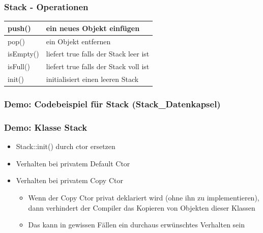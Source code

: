 \begin{multicols}{2}
\subsubsection{Stack - Operationen}
\begin{tabular}{ll}
	\hline 
	push() & ein neues Objekt einfügen \\ 
	\hline 
	pop() & ein Objekt entfernen \\ 
	\hline 
	isEmpty() & liefert true falls der Stack leer ist \\ 
	\hline 
	isFull() & liefert true falls der Stack voll ist \\ 
	\hline 
	init() & initialisiert einen leeren Stack \\ 
	\hline 
\end{tabular}
\end{multicols}

\subsubsection{Demo: Codebeispiel für Stack (Stack\_Datenkapsel)}



\subsubsection{Demo: Klasse Stack}
\begin{itemize}
	\item Stack::init() durch ctor ersetzen
	\item Verhalten bei privatem Default Ctor
	\item Verhalten bei privatem Copy Ctor
	\begin{itemize}
		\item Wenn der Copy Ctor privat deklariert wird (ohne ihn zu implementieren), dann verhindert der Compiler das Kopieren von Objekten dieser Klassen
		\item Das kann in gewissen Fällen ein durchaus erwünschtes Verhalten sein
	\end{itemize}
\end{itemize}

